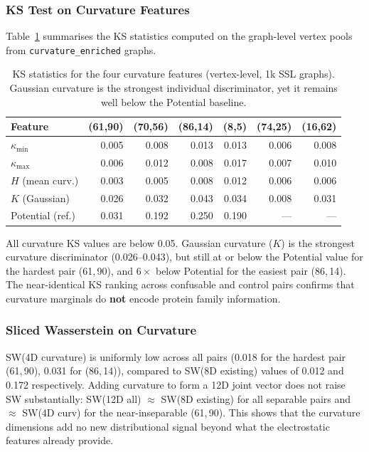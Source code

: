 \subsubsection{KS Test on Curvature Features}

Table~\ref{tab:ks_curv} summarises the KS statistics computed on the
graph-level vertex pools from \texttt{curvature\_enriched} graphs.

\begin{table}[ht]
  \centering
  \caption{KS statistics for the four curvature features (vertex-level, 1k
           SSL graphs).
           Gaussian curvature is the strongest individual discriminator, yet
           it remains well below the Potential baseline.}
  \label{tab:ks_curv}
  \begin{tabular}{lrrrrrr}
    \toprule
    \textbf{Feature}
      & \textbf{(61,90)} & \textbf{(70,56)} & \textbf{(86,14)}
      & \textbf{(8,5)}   & \textbf{(74,25)} & \textbf{(16,62)} \\
    \midrule
    $\kappa_\text{min}$ & 0.005 & 0.008 & 0.013 & 0.013 & 0.006 & 0.008 \\
    $\kappa_\text{max}$ & 0.006 & 0.012 & 0.008 & 0.017 & 0.007 & 0.010 \\
    $H$ (mean curv.)    & 0.003 & 0.005 & 0.008 & 0.012 & 0.006 & 0.006 \\
    $K$ (Gaussian)      & 0.026 & 0.032 & 0.043 & 0.034 & 0.008 & 0.031 \\
    \midrule
    Potential (ref.)    & 0.031 & 0.192 & 0.250 & 0.190 & ---   & ---   \\
    \bottomrule
  \end{tabular}
\end{table}

All curvature KS values are below 0.05.
Gaussian curvature ($K$) is the strongest curvature discriminator
(0.026--0.043), but still at or below the Potential value for the hardest
pair (61,\,90), and $6\times$ below Potential for the easiest pair
(86,\,14).
The near-identical KS ranking across confusable and control pairs confirms
that curvature marginals do \textbf{not} encode protein family information.

\subsubsection{Sliced Wasserstein on Curvature}

SW(4D curvature) is uniformly low across all pairs
(0.018 for the hardest pair (61,\,90), 0.031 for (86,\,14)), compared to
SW(8D existing) values of 0.012 and 0.172 respectively.
Adding curvature to form a 12D joint vector does not raise SW substantially:
SW(12D all) $\approx$ SW(8D existing) for all separable pairs and
$\approx$ SW(4D curv) for the near-inseparable (61,\,90).
This shows that the curvature dimensions add no new distributional signal
beyond what the electrostatic features already provide.


